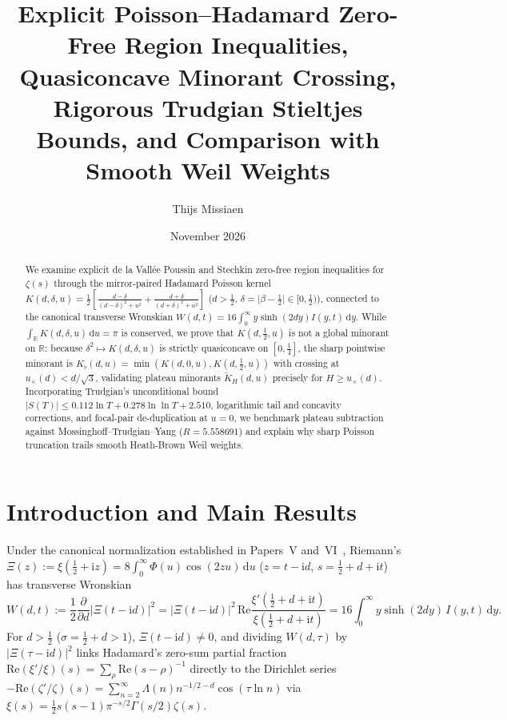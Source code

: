 \documentclass[11pt,reqno]{amsart}
\title[Poisson--Hadamard Inequalities and Quasiconcave Minorants]{Explicit Poisson--Hadamard Zero-Free Region Inequalities, Quasiconcave Minorant Crossing, Rigorous Trudgian Stieltjes Bounds, and Comparison with Smooth Weil Weights}
\author{Thijs Missiaen}
\date{November 2026}
\theoremstyle{definition}
\theoremstyle{remark}
\numberwithin{equation}{section}
\newcommand{\R}{\mathbb{R}}
\newcommand{\dd}{\mathrm{d}}
\newcommand{\ii}{\mathrm{i}}
\newcommand{\Rea}{\mathrm{Re}}
\begin{document}
\begin{abstract}
We examine explicit de la Vall\'ee Poussin and Stechkin zero-free region inequalities for $\zeta(s)$ through the mirror-paired Hadamard Poisson kernel $K(d, \delta, u) = \frac{1}{2}[\frac{d-\delta}{(d-\delta)^2+u^2} + \frac{d+\delta}{(d+\delta)^2+u^2}]$ ($d > \frac{1}{2}$, $\delta = \lvert\beta - \frac{1}{2}\rvert \in [0, \frac{1}{2})$), connected to the canonical transverse Wronskian $W(d,t) = 16\int_0^{\infty} y\sinh(2dy)I(y,t)\,\dd y$. While $\int_{\R} K(d, \delta, u)\,\dd u = \pi$ is conserved, we prove that $K(d, \frac{1}{2}, u)$ is not a global minorant on $\R$: because $\delta^2 \mapsto K(d, \delta, u)$ is strictly quasiconcave on $[0, \frac{1}{4}]$, the sharp pointwise minorant is $K_{\flat}(d,u) = \min(K(d,0,u), K(d,\frac{1}{2},u))$ with crossing at $u_{\times}(d) < d/\sqrt{3}$, validating plateau minorants $\widetilde{K}_H(d,u)$ precisely for $H \ge u_{\times}(d)$. Incorporating Trudgian's unconditional bound $\lvert S(T)\rvert \le 0.112\ln T + 0.278\ln\ln T + 2.510$, logarithmic tail and concavity corrections, and focal-pair de-duplication at $u = 0$, we benchmark plateau subtraction against Mossinghoff--Trudgian--Yang ($R = 5.558691$) and explain why sharp Poisson truncation trails smooth Heath-Brown Weil weights.
\end{abstract}

\maketitle

\section{Introduction and Main Results}\label{sec:intro}

Under the canonical normalization established in Papers~V and~VI~\cite{missiaen2026p5,missiaen2026p6}, Riemann's $\Xi(z) := \xi(\frac{1}{2} + \ii z) = 8\int_0^{\infty} \Phi(u)\cos(2zu)\,\dd u$ ($z = t - \ii d$, $s = \frac{1}{2} + d + \ii t$)~\cite{riemann1859,jacobi1829,polya1926} has transverse Wronskian~\cite{speiser1934,lagarias1999,hinkkanen1997,csordas1986,wigner1932,hudson1974}
\begin{equation}\label{eq:W_canonical_p7}
W(d,t) := \frac{1}{2}\frac{\partial}{\partial d}\bigl\lvert\Xi(t - \ii d)\bigr\rvert^2 = \bigl\lvert\Xi(t - \ii d)\bigr\rvert^2\,\Rea\frac{\xi'(\frac{1}{2} + d + \ii t)}{\xi(\frac{1}{2} + d + \ii t)} = 16\int_0^{\infty} y\sinh(2dy)\,I(y,t)\,\dd y.
\end{equation}
For $d > \frac{1}{2}$ ($\sigma = \frac{1}{2} + d > 1$), $\Xi(t - \ii d) \ne 0$, and dividing $W(d, \tau)$ by $\lvert\Xi(\tau - \ii d)\rvert^2$ links Hadamard's zero-sum partial fraction $\Rea(\xi'/\xi)(s) = \sum_{\rho} \Rea(s - \rho)^{-1}$ directly to the Dirichlet series $-\Rea(\zeta'/\zeta)(s) = \sum_{n=2}^{\infty} \Lambda(n)n^{-1/2-d}\cos(\tau\ln n)$ via $\xi(s) = \frac{1}{2}s(s-1)\pi^{-s/2}\Gamma(s/2)\zeta(s)$.
\end{document}
